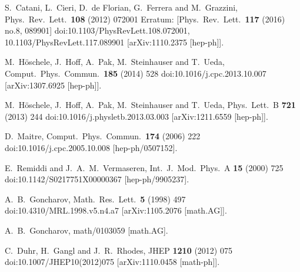 \documentclass[12pt]{article}
\begin{document}
\begin{thebibliography}{99}
  S.~Catani, L.~Cieri, D.~de Florian, G.~Ferrera and M.~Grazzini,
  Phys.\ Rev.\ Lett.\  {\bf 108} (2012) 072001
   Erratum: [Phys.\ Rev.\ Lett.\  {\bf 117} (2016) no.8,  089901]
  doi:10.1103/PhysRevLett.108.072001, 10.1103/PhysRevLett.117.089901
  [arXiv:1110.2375 [hep-ph]].

  M.~Höschele, J.~Hoff, A.~Pak, M.~Steinhauser and T.~Ueda,
  Comput.\ Phys.\ Commun.\  {\bf 185} (2014) 528
  doi:10.1016/j.cpc.2013.10.007
  [arXiv:1307.6925 [hep-ph]].
  
  M.~Höschele, J.~Hoff, A.~Pak, M.~Steinhauser and T.~Ueda,
  Phys.\ Lett.\ B {\bf 721} (2013) 244
  doi:10.1016/j.physletb.2013.03.003
  [arXiv:1211.6559 [hep-ph]].
  
  D.~Maitre,
  Comput.\ Phys.\ Commun.\  {\bf 174} (2006) 222
  doi:10.1016/j.cpc.2005.10.008
  [hep-ph/0507152].
  
  E.~Remiddi and J.~A.~M.~Vermaseren,
  Int.\ J.\ Mod.\ Phys.\ A {\bf 15} (2000) 725
  doi:10.1142/S0217751X00000367
  [hep-ph/9905237].
  
  A.~B.~Goncharov,
  Math.\ Res.\ Lett.\  {\bf 5} (1998) 497
  doi:10.4310/MRL.1998.v5.n4.a7
  [arXiv:1105.2076 [math.AG]].
  
  A.~B.~Goncharov,
  math/0103059 [math.AG].
  
  C.~Duhr, H.~Gangl and J.~R.~Rhodes,
  JHEP {\bf 1210} (2012) 075
  doi:10.1007/JHEP10(2012)075
  [arXiv:1110.0458 [math-ph]].
  

\end{thebibliography}
\end{document}
